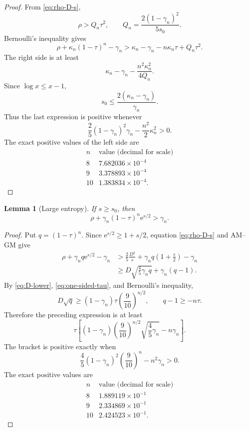 \documentclass[11pt,a4paper]{article}
\numberwithin{equation}{section}
\newtheorem{lemma}[theorem]{Lemma}
\theoremstyle{definition}
\newcommand{\1}{\mathbf{1}}
\newcommand{\e}{\mathrm{e}}
\begin{document}
\begin{proof}
From \eqref{eq:rho-D-s},
\[
 \rho>Q_n\tau^2,
 \qquad
 Q_n=\frac{2(1-\gamma_n)^2}{5s_0}.
\]
Bernoulli's inequality gives
\[
 \rho+\kappa_n(1-\tau)^n-\gamma_n
 >\kappa_n-\gamma_n-n\kappa_n\tau+Q_n\tau^2.
\]
The right side is at least
\[
 \kappa_n-\gamma_n-\frac{n^2\kappa_n^2}{4Q_n}.
\]
Since $\log x\le x-1$,
\[
 s_0\le\frac{2(\kappa_n-\gamma_n)}{\gamma_n}.
\]
Thus the last expression is positive whenever
\begin{equation}\label{eq:small-certificate-condition}
 \frac25(1-\gamma_n)^2\gamma_n
 -\frac{n^2}{2}\kappa_n^2>0.
\end{equation}
The exact positive values of the left side are
\begin{equation}\label{eq:small-certificates}
\begin{array}{c|c}
 n&\text{value (decimal for scale)}\\ \hline
 8&7.682036\times10^{-4}\\
 9&3.378893\times10^{-4}\\
 10&1.383834\times10^{-4}.
\end{array}
\end{equation}
\end{proof}

\begin{lemma}[Large entropy]\label{lem:large-entropy}
If $s\ge s_0$, then
\begin{equation}\label{eq:large-contradiction}
 \rho+\gamma_n(1-\tau)^n\e^{s/2}>\gamma_n.
\end{equation}
\end{lemma}

\begin{proof}
Put $q=(1-\tau)^n$.  Since $\e^{s/2}\ge1+s/2$, equation \eqref{eq:rho-D-s} and AM--GM give
\[
 \begin{aligned}
 \rho+\gamma_nq\e^{s/2}-\gamma_n
 &>\frac25\frac{D^2}{s}
   +\gamma_nq\left(1+\frac{s}{2}\right)-\gamma_n\\
 &\ge D\sqrt{\frac45\gamma_nq}+\gamma_n(q-1).
 \end{aligned}
\]
By \eqref{eq:D-lower}, \eqref{eq:one-sided-tau}, and Bernoulli's inequality,
\[
 D\sqrt q
 \ge(1-\gamma_n)\tau\left(\frac9{10}\right)^{n/2},
 \qquad
 q-1\ge-n\tau.
\]
Therefore the preceding expression is at least
\[
 \tau\left[
 (1-\gamma_n)\left(\frac9{10}\right)^{n/2}
 \sqrt{\frac45\gamma_n}
 -n\gamma_n
 \right].
\]
The bracket is positive exactly when
\begin{equation}\label{eq:large-certificate-condition}
 \frac45(1-\gamma_n)^2\left(\frac9{10}\right)^n
 -n^2\gamma_n>0.
\end{equation}
The exact positive values are
\begin{equation}\label{eq:large-certificates}
\begin{array}{c|c}
 n&\text{value (decimal for scale)}\\ \hline
 8&1.889119\times10^{-1}\\
 9&2.334869\times10^{-1}\\
 10&2.424523\times10^{-1}.
\end{array}
\end{equation}
\end{proof}
\end{document}
